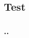 \documentclass[ignorenonframetext,14pt]{beamer}
\begin{document}
\subsection{Test}

\begin{frame}
    \frametitle{\insertsectionnumber.\insertsubsectionnumber. \insertsubsectionhead}

\end{frame}


%
%
%
\end{document}
